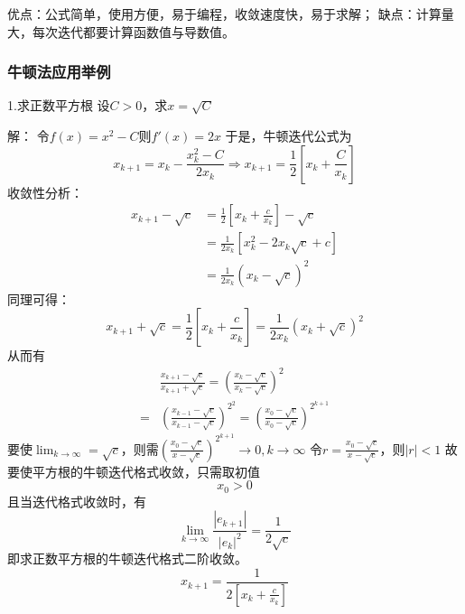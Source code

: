\begin{remark}[牛顿迭代法的优缺点]
    优点：公式简单，使用方便，易于编程，收敛速度快，易于求解；
    缺点：计算量大，每次迭代都要计算函数值与导数值。
\end{remark}


\subsubsection{牛顿法应用举例}
1.求正数平方根
设$C > 0$，求$x = \sqrt{C}$
\begin{solution}
    解：
    令$f(x) = x^2-C$则$f'(x) = 2x$
    于是，牛顿迭代公式为
    \begin{equation*}
        x_{k+1} = x_k-\frac{x_k^2-C}{2x_k} \Rightarrow x_{k+1} = \frac{1}{2}[x_k+\frac{C}{x_k}]
    \end{equation*}
    收敛性分析：
    \begin{align*}
        x_{k+1}-\sqrt{c} & = \frac{1}{2}[x_k+\frac{c}{x_k}]-\sqrt{c}\\
        & = \frac{1}{2x_k}[x^2_k-2x_k\sqrt{c}+c]\\
        & = \frac{1}{2x_k}(x_k-\sqrt{c})^2
    \end{align*}
    同理可得：
    \begin{equation*}
        x_{k+1}+\sqrt{c} = \frac{1}{2}[x_k+\frac{c}{x_k}] = \frac{1}{2x_k}(x_k+\sqrt{c})^2
    \end{equation*}
    从而有
    \begin{align*}
        &\frac{x_{k+1}-\sqrt{c}}{x_{k+1}+\sqrt{c}}
        = \left(\frac{x_{k}-\sqrt{c}}{x_{k}-\sqrt{c}}\right)^2 \\
        =& \left(\frac{x_{k-1}-\sqrt{c}}{x_{k-1}-\sqrt{c}}\right)^{2^2}
        = \left(\frac{x_{0}-\sqrt{c}}{x_{0}-\sqrt{c}}\right)^{2^{k+1}}
    \end{align*}
    要使$\lim_{k \to \infty} = \sqrt{c}$，则需$(\frac{x_{0}-\sqrt{c}}{x_{}-\sqrt{c}})^{2^{k+1}} \to 0,k \to \infty$
    令$r = \frac{x_{0}-\sqrt{c}}{x_{}-\sqrt{c}}$，则$|r| < 1$
    故要使平方根的牛顿迭代格式收敛，只需取初值
    \[x_0 > 0\]
    且当迭代格式收敛时，有
    \begin{equation*}
        \lim_{k \to \infty}\frac{|e_{k+1}|}{|e_k|^2} = \frac{1}{2\sqrt{c}}
    \end{equation*}
    即求正数平方根的牛顿迭代格式二阶收敛。
    \begin{equation*}
        x_{k+1} = \frac{1}{2[x_k+\frac{c}{x_k}]}
    \end{equation*}
\end{solution}

